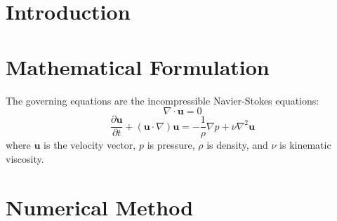 \documentclass[preprint,12pt]{elsarticle}
\begin{document}

\section{Introduction}
\label{sec:introduction}


\section{Mathematical Formulation}
\label{sec:formulation}

The governing equations are the incompressible Navier-Stokes equations:
\begin{equation}
  \nabla \cdot \mathbf{u} = 0
  \label{eq:continuity}
\end{equation}
\begin{equation}
  \frac{\partial \mathbf{u}}{\partial t} + (\mathbf{u} \cdot \nabla)\mathbf{u}
  = -\frac{1}{\rho}\nabla p + \nu \nabla^2 \mathbf{u}
  \label{eq:momentum}
\end{equation}
where $\mathbf{u}$ is the velocity vector, $p$ is pressure, $\rho$ is density,
and $\nu$ is kinematic viscosity.


\section{Numerical Method}
\label{sec:method}
\end{document}
